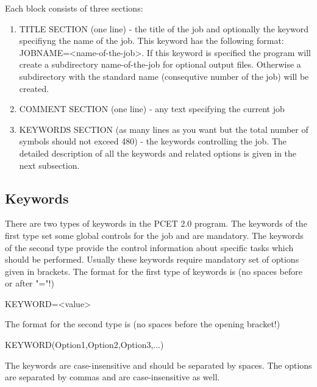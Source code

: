 \documentclass[oneside,11pt,openany]{book}
\newcommand{\tw}{\ttfamily}
\begin{document}
Each block consists of three sections:
\begin{enumerate}
\item TITLE SECTION (one line) -
      the title of the job and optionally the keyword
      specifiyng the name of the job. This keyword
      has the following format: {\tw JOBNAME=<name-of-the-job>}.
      If this keyword is specified the program will
      create a subdirectory {\tw name-of-the-job}
      for optional output files. Otherwise a subdirectory
      with the standard name (consequtive number of the job)
      will be created.

\item COMMENT SECTION (one line) -
      any text specifying the current job

\item KEYWORDS SECTION (as many lines as you want but the total
      number of symbols should not exceed 480) - the keywords
      controlling the job. The detailed description of all
      the keywords and related options is given in the next
      subsection.

\end{enumerate}

\subsection{Keywords}
There are two types of keywords in the PCET 2.0 program. The keywords
of the first type set some global controls for the job and are
mandatory. The keywords of the second type provide the control
information about specific tasks which should be performed.
Usually these keywords require mandatory set of options given
in brackets. The format for the first type of keywords is
(no spaces before or after "="!)

\begin{description}
\item {\tw KEYWORD=<value>}
\end{description}

\noindent The format for the second type is (no spaces before
the opening bracket!)

\begin{description}
\item {\tw KEYWORD(Option1,Option2,Option3,...)}
\end{description}

\noindent The keywords are case-insensitive and should be separated
by spaces. The options are separated by commas and are case-insensitive
as well.
\end{document}
